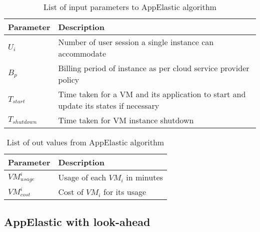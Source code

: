 \begin{center}
  \begin{table}
    \begin{tabular}{ | L{6cm} | L{6cm} |}
      \hline
      Parameter & Description \\ \hline
      \( U_{i} \) & Number of user session a single instance can accommodate  \\ \hline
      \( B_{p} \) & Billing period of instance as per cloud service provider policy \\ \hline
      \( T_{start} \) & Time taken for a VM and its application to start  and update its states if necessary  \\ \hline
      \( T_{shutdown} \) & Time taken for VM instance shutdown\\ \hline
    \end{tabular}
    \caption{List of input parameters to AppElastic algorithm}
     \label{table:paratable}
\end{table}
\end{center}

\begin{center}
  \begin{table}
    \begin{tabular}{ | L{6cm} | L{6cm} |}
      \hline
      Parameter & Description \\ \hline
      $VM_{usage}^{i}$ & Usage of each $VM_{i}$ in minutes  \\ \hline
      $VM_{cost}^{i}$ & Cost of $VM_{i}$ for its usage \\ \hline
    \end{tabular}
    \caption{List of out values from AppElastic algorithm}
     \label{table:outputtable}
\end{table}
\end{center}


\subsection{AppElastic with look-ahead}
\label{sub:AppElastic with look-ahead}
